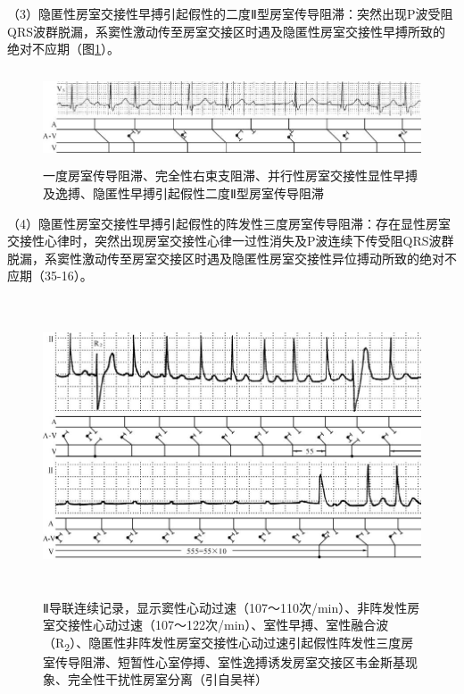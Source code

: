 （3）隐匿性房室交接性早搏引起假性的二度Ⅱ型房室传导阻滞：突然出现P波受阻QRS波群脱漏，系窦性激动传至房室交接区时遇及隐匿性房室交接性早搏所致的绝对不应期（图\ref{fig35-15}）。

\begin{figure}[!htbp]
 \centering
 \includegraphics[width=5.80208in,height=1.08333in]{./images/Image00568.jpg}
 \captionsetup{justification=centering}
 \caption{一度房室传导阻滞、完全性右束支阻滞、并行性房室交接性显性早搏及逸搏、隐匿性早搏引起假性二度Ⅱ型房室传导阻滞}
 \label{fig35-15}
  \end{figure} 

（4）隐匿性房室交接性早搏引起假性的阵发性三度房室传导阻滞：存在显性房室交接性心律时，突然出现房室交接性心律一过性消失及P波连续下传受阻QRS波群脱漏，系窦性激动传至房室交接区时遇及隐匿性房室交接性异位搏动所致的绝对不应期（35-16）。

\begin{figure}[!htbp]
 \centering
 \includegraphics[width=5.78125in,height=3.46875in]{./images/Image00569.jpg}
 \captionsetup{justification=centering}
 \caption{Ⅱ导联连续记录，显示窦性心动过速（107～110次/min）、非阵发性房室交接性心动过速（107～122次/min）、室性早搏、室性融合波（R\textsubscript{2}）、隐匿性非阵发性房室交接性心动过速引起假性阵发性三度房室传导阻滞、短暂性心室停搏、室性逸搏诱发房室交接区韦金斯基现象、完全性干扰性房室分离（引自吴祥）}
 \label{fig35-16}
  \end{figure} 


